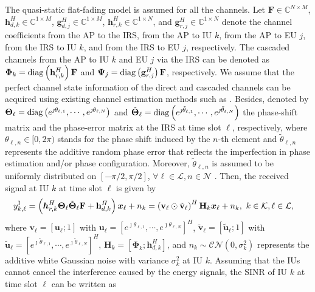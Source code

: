 \documentclass[12pt,draftclsnofoot, onecolumn]{IEEEtran}
\newcommand{\bm}[1]{\mbox{\boldmath{$#1$}}}
\theoremstyle{plain}
\begin{document}
\begin{sloppypar}
The quasi-static flat-fading model is assumed for all the channels. Let $\mathbf F \in\mathbb C^{N\times M}$, $\mathbf h_{d,k}^H \in\mathbb C^{1\times M}$, $\mathbf g_{d,j}^H \in\mathbb C^{1\times M}$, $\mathbf h_{r,k}^H \in\mathbb C^{1\times N}$, and $\mathbf g_{r,j}^H \in\mathbb C^{1\times N}$ denote the channel coefficients from the AP to the IRS, from the AP to IU $k$, from the AP to EU $j$, from the IRS to IU $k$, and from the IRS to EU $j$, respectively. The cascaded channels from the AP to IU $k$ and EU $j$ via the IRS can be denoted as $\mathbf \Phi_k = {\rm diag}\left(\mathbf h_{r,k}^H\right)\mathbf F$ and $\mathbf \Psi_j = {\rm diag}\left(\mathbf g_{r,j}^H\right)\mathbf F$, respectively. We assume that the perfect channel state information of the direct and cascaded channels can be acquired using existing channel estimation methods such as \cite{2020_G.T._Channel_PARAFAC-Based, 2021_Wei_Channel_RIS-Empowered}. Besides, denoted by $\mathbf \Theta_\ell = {\rm diag}\left( e^{\jmath \theta_{\ell,1}}, \cdots, e^{\jmath \theta_{\ell,N}}\right)$ and $\tilde{\mathbf \Theta}_\ell = {\rm diag}\left( e^{\jmath \tilde{\theta}_{\ell,1}}, \cdots, e^{\jmath \tilde{\theta}_{\ell,N}}\right)$ the phase-shift matrix and the phase-error matrix at the IRS at time slot $\ell$, respectively, where $\theta_{\ell,n} \in [0,2\pi)$ stands for the phase shift induced by the $n$-th element and $\tilde{\theta}_{\ell,n}$ represents the additive random phase error that reflects the imperfection in phase estimation and/or phase configuration. Moreover, $\tilde{\theta}_{\ell,n}$ is assumed to be uniformly distributed on $\left[-{\pi}/{2}, {\pi}/{2}\right]$, $\forall \ell \in\mathcal L, n\in\mathcal N$ \cite{2021_Xing_error}. Then, the received signal at IU $k$ at time slot $\ell$ is given by 
\begin{align}
y_{k,\ell}^{\rm I} & = \left(\bm h_{r,k}^H\mathbf \Theta_\ell\tilde{\mathbf \Theta}_{\ell}\mathbf F + \mathbf h_{d,k}^H \right) \bm x_\ell + n_k = \left(\mathbf v_\ell\odot\tilde {\mathbf v}_\ell\right)^H\mathbf H_k\bm x_\ell + n_k, \ k\in\mathcal K, \ell\in\mathcal L, 
\end{align}
where $\mathbf v_\ell = \left[\mathbf u_\ell; 1\right]$ with $\mathbf u_\ell = \left[e^{\jmath\theta_{\ell,1}},\cdots, e^{\jmath\theta_{\ell,N}}\right]^H$,  $\tilde {\mathbf v}_\ell = \left[\tilde {\mathbf u}_\ell; 1\right]$ with $\tilde {\mathbf u}_\ell = \left[e^{\jmath\tilde {\theta}_{\ell,1}},\cdots, e^{\jmath\tilde {\theta}_{\ell,N}}\right]^H$, $\mathbf H_k = \left[\mathbf \Phi_k;\mathbf h_{d,k}^H\right]$, and $n_k \sim\mathcal {CN} \left(0, \sigma_k^2 \right)$ represents the additive white Gaussian noise with variance $\sigma_k^2$ at IU $k$. Assuming that the IUs cannot cancel the interference caused by the energy signals, the SINR of IU $k$ at time slot $\ell$ can be written as

\end{sloppypar}
\end{document}
